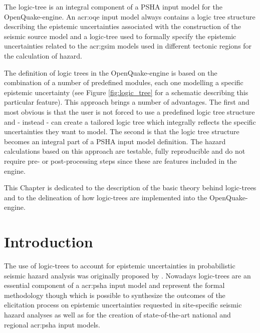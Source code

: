 %
The logic-tree is an integral component of a PSHA input model for the 
OpenQuake-engine. 
%
An \gls{acr:oqe} input model always contains a logic tree structure 
describing the epistemic uncertainties associated with the construction 
of the seismic source model and a logic-tree used to formally specify 
the epistemic uncertainties related to the \gls{acr:gsim} models used in 
different tectonic regions for the calculation of hazard.

The definition of logic trees in the OpenQuake-engine is based on the
combination of a number of predefined modules, each one modelling a specific
epistemic uncertainty (see Figure \ref{fig:logic_tree}
for a schematic describing this particular feature). 
%
This approach brings a number of advantages. The first and most obvious  
is that the user is not forced to use a predefined logic tree structure and
- instead - can create a tailored logic tree which integrally 
reflects the specific uncertainties they want to model. 
%
The second is that the logic tree structure becomes an integral part of  
a PSHA input model definition. The hazard calculations based on this approach
are testable, fully reproducible and do not require pre- or 
post-processing steps since these are features included in the engine.

This Chapter is dedicated to the description of the basic theory behind 
logic-trees and to the delineation of how logic-trees are implemented 
into the OpenQuake-engine.
%
\section{Introduction}
The use of logic-trees to account for epistemic uncertainties in  
probabilistic seismic hazard analysis was originally proposed by 
\textcite{kulkarni84}.
%
Nowadays logic-trees are an essential component of a \gls{acr:psha} input
model and represent the formal methodology though which is possible to 
synthesize the outcomes of the elicitation process on epistemic uncertainties
requested in site-specific seismic hazard analyses \parencite{budnitz1997}
as well as for the creation of state\--of\--the\--art national and 
regional \gls{acr:psha} input models. 

